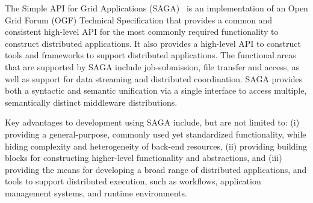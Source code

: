 \documentclass[]{svjour3}
\begin{document}

 The Simple API for Grid Applications
(SAGA)~\cite{saga_url} is an implementation of an Open Grid Forum
(OGF) Technical Specification that provides a common and consistent
high-level API for the most commonly required functionality to
construct distributed applications. It also provides a high-level API
to construct tools and frameworks to support distributed
applications. The functional areas that are supported by SAGA include
job-submission, file transfer and access, as well as support for data
streaming and distributed coordination. SAGA provides both a syntactic
and semantic unification via a single interface to access multiple,
semantically distinct middleware distributions.

Key advantages to development using SAGA include, but are not limited to:
(i) providing a general-purpose, commonly used yet standardized functionality, while
hiding complexity and heterogeneity of back-end resources, (ii)
providing building blocks for constructing higher-level functionality
and abstractions, and (iii) providing the means for developing a broad
range of distributed applications, and tools to support distributed
execution, such as workflows, application management systems, and runtime environments.
\end{document}
